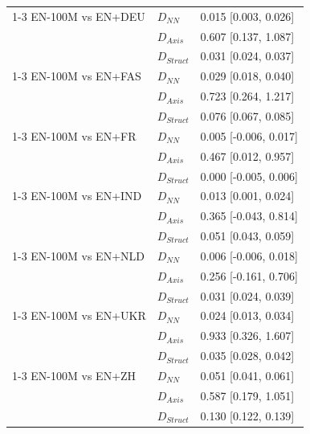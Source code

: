 \begin{tabular}{@{}lll@{}}
\cmidrule(lr){1-3}
EN-100M vs EN+DEU & $D_{NN}$ & 0.015 [0.003, 0.026] \\
 & $D_{Axis}$ & 0.607 [0.137, 1.087] \\
 & $D_{Struct}$ & 0.031 [0.024, 0.037] \\
\cmidrule(lr){1-3}
EN-100M vs EN+FAS & $D_{NN}$ & 0.029 [0.018, 0.040] \\
 & $D_{Axis}$ & 0.723 [0.264, 1.217] \\
 & $D_{Struct}$ & 0.076 [0.067, 0.085] \\
\cmidrule(lr){1-3}
EN-100M vs EN+FR & $D_{NN}$ & 0.005 [-0.006, 0.017] \\
 & $D_{Axis}$ & 0.467 [0.012, 0.957] \\
 & $D_{Struct}$ & 0.000 [-0.005, 0.006] \\
\cmidrule(lr){1-3}
EN-100M vs EN+IND & $D_{NN}$ & 0.013 [0.001, 0.024] \\
 & $D_{Axis}$ & 0.365 [-0.043, 0.814] \\
 & $D_{Struct}$ & 0.051 [0.043, 0.059] \\
\cmidrule(lr){1-3}
EN-100M vs EN+NLD & $D_{NN}$ & 0.006 [-0.006, 0.018] \\
 & $D_{Axis}$ & 0.256 [-0.161, 0.706] \\
 & $D_{Struct}$ & 0.031 [0.024, 0.039] \\
\cmidrule(lr){1-3}
EN-100M vs EN+UKR & $D_{NN}$ & 0.024 [0.013, 0.034] \\
 & $D_{Axis}$ & 0.933 [0.326, 1.607] \\
 & $D_{Struct}$ & 0.035 [0.028, 0.042] \\
\cmidrule(lr){1-3}
EN-100M vs EN+ZH & $D_{NN}$ & 0.051 [0.041, 0.061] \\
 & $D_{Axis}$ & 0.587 [0.179, 1.051] \\
 & $D_{Struct}$ & 0.130 [0.122, 0.139] \\
\bottomrule
\end{tabular}
